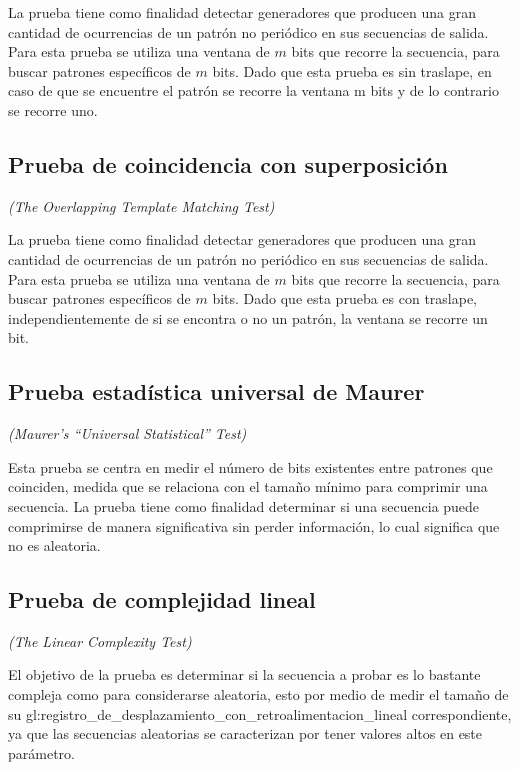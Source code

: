 La prueba tiene como finalidad detectar generadores que producen una gran
cantidad de ocurrencias de un patrón no periódico en sus secuencias de salida.
Para esta prueba se utiliza una ventana de $m$ bits que recorre la secuencia,
para buscar patrones específicos de $m$ bits. Dado que esta prueba es sin
traslape, en caso de que se encuentre el patrón se recorre la ventana m bits
y de lo contrario se recorre uno.

\subsection{Prueba de coincidencia con superposición} %
\textit{(The Overlapping Template Matching Test)}

La prueba tiene como finalidad detectar generadores que producen una gran
cantidad de ocurrencias de un patrón no periódico en sus secuencias de salida.
Para esta prueba se utiliza una ventana de $m$ bits que recorre la secuencia,
para buscar patrones específicos de $m$ bits. Dado que esta prueba es con
traslape, independientemente de si se encontra o no un patrón, la ventana se
recorre un bit.

\subsection{Prueba estadística universal de Maurer} %
\textit{(Maurer’s “Universal Statistical” Test)}

Esta prueba se centra en medir el número de bits existentes entre patrones
que coinciden, medida que se relaciona con el tamaño mínimo para comprimir
una secuencia. La prueba tiene como finalidad determinar si una secuencia
puede comprimirse de manera significativa sin perder información, lo cual
significa que no es aleatoria.

\subsection{Prueba de complejidad lineal} %
\textit{(The Linear Complexity Test)}

El objetivo de la prueba es determinar si la secuencia a probar es lo bastante
compleja como para considerarse aleatoria, esto por medio de medir el tamaño de
su \gls{gl:registro_de_desplazamiento_con_retroalimentacion_lineal}
correspondiente, ya que las secuencias aleatorias se caracterizan por tener
valores altos en este parámetro.

